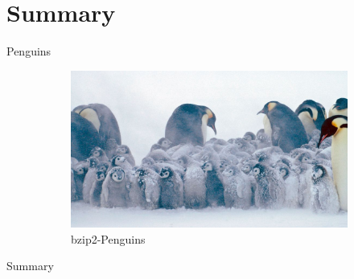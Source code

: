 \documentclass[10pt, compress]{beamer}
\begin{document}
\section{Summary}
\begin{frame}{Penguins}
\begin{figure}
\captionsetup[subfigure]{labelformat=empty}
  \begin{subfigure}[b]{.45\linewidth}
    \centering
    \caption{bzip2-Penguins}
    \includegraphics[scale=0.15, angle=5]{pics/bzip2penguin.jpg}
  \end{subfigure}\hfill
  \begin{subfigure}[b]{.45\linewidth}
  	\centering
  \end{subfigure}
\end{figure}
\end{frame}


\begin{frame}{Summary}
\end{frame}
\end{document}
